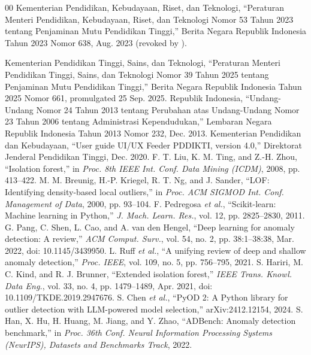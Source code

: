 \documentclass[conference]{IEEEtran}
\begin{document}
\begin{thebibliography}{00}
 Kementerian Pendidikan, Kebudayaan, Riset, dan Teknologi, ``Peraturan Menteri Pendidikan, Kebudayaan, Riset, dan Teknologi Nomor 53 Tahun 2023 tentang Penjaminan Mutu Pendidikan Tinggi,'' Berita Negara Republik Indonesia Tahun 2023 Nomor 638, Aug. 2023 (revoked by \cite{permendiktisaintek39_2025}).
 \raggedright Kementerian Pendidikan Tinggi, Sains, dan Teknologi, ``Peraturan Menteri Pendidikan Tinggi, Sains, dan Teknologi Nomor 39 Tahun 2025 tentang Penjaminan Mutu Pendidikan Tinggi,'' Berita Negara Republik Indonesia Tahun 2025 Nomor 661, promulgated 25 Sep. 2025.
 Republik Indonesia, ``Undang-Undang Nomor 24 Tahun 2013 tentang Perubahan atas Undang-Undang Nomor 23 Tahun 2006 tentang Administrasi Kependudukan,'' Lembaran Negara Republik Indonesia Tahun 2013 Nomor 232, Dec. 2013.
 Kementerian Pendidikan dan Kebudayaan, ``User guide UI/UX Feeder PDDIKTI, version 4.0,'' Direktorat Jenderal Pendidikan Tinggi, Dec. 2020.
 F. T. Liu, K. M. Ting, and Z.-H. Zhou, ``Isolation forest,'' in \textit{Proc. 8th IEEE Int. Conf. Data Mining (ICDM)}, 2008, pp. 413--422.
 M. M. Breunig, H.-P. Kriegel, R. T. Ng, and J. Sander, ``LOF: Identifying density-based local outliers,'' in \textit{Proc. ACM SIGMOD Int. Conf. Management of Data}, 2000, pp. 93--104.
 F. Pedregosa \textit{et al.}, ``Scikit-learn: Machine learning in Python,'' \textit{J. Mach. Learn. Res.}, vol. 12, pp. 2825--2830, 2011.
 G. Pang, C. Shen, L. Cao, and A. van den Hengel, ``Deep learning for anomaly detection: A review,'' \textit{ACM Comput. Surv.}, vol. 54, no. 2, pp. 38:1--38:38, Mar. 2022, doi: 10.1145/3439950.
 L. Ruff \textit{et al.}, ``A unifying review of deep and shallow anomaly detection,'' \textit{Proc. IEEE}, vol. 109, no. 5, pp. 756--795, 2021.
 S. Hariri, M. C. Kind, and R. J. Brunner, ``Extended isolation forest,'' \textit{IEEE Trans. Knowl. Data Eng.}, vol. 33, no. 4, pp. 1479--1489, Apr. 2021, doi: 10.1109/TKDE.2019.2947676.
 S. Chen \textit{et al.}, ``PyOD 2: A Python library for outlier detection with LLM-powered model selection,'' arXiv:2412.12154, 2024.
 S. Han, X. Hu, H. Huang, M. Jiang, and Y. Zhao, ``ADBench: Anomaly detection benchmark,'' in \textit{Proc. 36th Conf. Neural Information Processing Systems (NeurIPS), Datasets and Benchmarks Track}, 2022.

\end{thebibliography}
\end{document}

